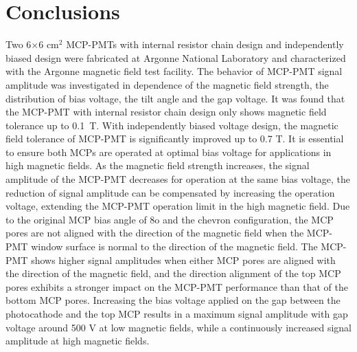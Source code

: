 \documentclass[preprint,5p]{elsarticle}
\begin{document}
\section{Conclusions}
Two 6$\times$6 cm$^2$ MCP-PMTs with internal resistor chain design and 
independently biased design were fabricated at Argonne National Laboratory and 
characterized with the Argonne magnetic field test facility. The behavior of 
MCP-PMT signal amplitude was investigated in dependence of the magnetic field 
strength, the distribution of bias voltage, the tilt angle and the gap voltage.  
It was found that the MCP-PMT with internal resistor chain design only shows 
magnetic field tolerance up to 0.1~T. With independently biased voltage design, 
the magnetic field tolerance of MCP-PMT is significantly improved up to 0.7 T.  
It is essential to ensure both MCPs are operated at optimal bias voltage for 
applications in high magnetic fields. As the magnetic field strength increases, 
the signal amplitude of the MCP-PMT decreases for operation at the same bias 
voltage, the reduction of signal amplitude can be compensated by increasing the 
operation voltage, extending the MCP-PMT operation limit in the high magnetic 
field. Due to the original MCP bias angle of 8o and the chevron configuration, 
the MCP pores are not aligned with the direction of the magnetic field when the 
MCP-PMT window surface is normal to the direction of the magnetic field. The 
MCP-PMT shows higher signal amplitudes when either MCP pores are aligned with 
the direction of the magnetic field, and the direction alignment of the top MCP 
pores exhibits a stronger impact on the MCP-PMT performance than that of the 
bottom MCP pores. Increasing the bias voltage applied on the gap between the 
photocathode and the top MCP results in a maximum signal amplitude with gap 
voltage around 500 V at low magnetic fields, while a continuously increased 
signal amplitude at high magnetic fields. 

  
\end{document}
